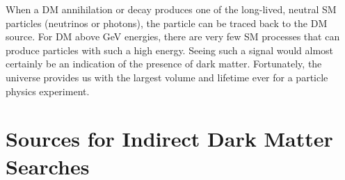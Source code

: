 When a DM annihilation or decay produces one of the long-lived, neutral SM particles (neutrinos or photons), the particle can be traced back to the DM source.
For DM above GeV energies, there are very few SM processes that can produce particles with such a high energy.
Seeing such a signal would almost certainly be an indication of the presence of dark matter.
Fortunately, the universe  provides us with the largest volume and lifetime ever for a particle physics experiment.

\section{Sources for Indirect Dark Matter Searches\label{sec:dm_targets}}

\begin{figure}
\end{figure}

